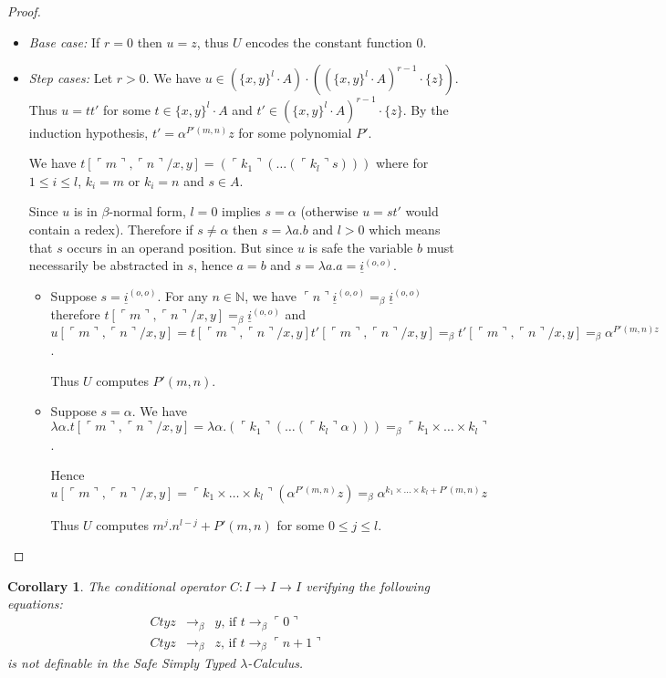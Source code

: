 \documentclass{article}
\newtheorem{corollary}[theorem]{Corollary}
\newcommand{\encode}[1]{\ulcorner #1 \urcorner}
\newcommand{\nat}{\mathbb{N}}
\begin{document}
\begin{proof}
\begin{itemize}

\item \emph{Base case:} If $r = 0$ then $u = z$, thus $U$ encodes the constant function $0$.

\item \emph{Step cases:} Let $r>0$. We have
 $u \in (\{ x, y\}^l \cdot A) \cdot \left( (\{ x, y\}^l \cdot A)^{r-1} \cdot \{ z \} \right)$. Thus $u = t t'$ for some $t \in \{ x, y\}^l \cdot A$ and $t' \in
(\{ x, y\}^l \cdot A)^{r-1} \cdot \{ z \}$. By the induction hypothesis, $t' = \alpha^{P'(m,n)} z$ for some polynomial $P'$.

We have $t[\encode{m}, \encode{n}/x,y] = (\encode{k_1} (\ldots (\encode{k_l} s)))$ where for $1 \leq i \leq l$, $k_i = m$ or $k_i = n$ and $s \in A$.

Since $u$ is in $\beta$-normal form, $l=0$ implies $s = \alpha$ 
(otherwise $u = s t'$ would contain a redex).
Therefore if $s \neq \alpha$ then $s=\lambda a . b$ and $l>0$ which means that $s$ occurs in an operand position. But since $u$ is safe the variable $b$ must necessarily be abstracted in $s$, hence $a=b$ and $s =  \lambda a . a = \underline{i}^{(o,o)}$.

\begin{itemize}
\item Suppose $s= \underline{i}^{(o,o)}$.
For any $n \in \nat$, we have $\encode{n} \underline{i}^{(o,o)} =_\beta \underline{i}^{(o,o)}$ therefore $t[\encode{m}, \encode{n}/x,y] =_\beta \underline{i}^{(o,o)}$ and $u[\encode{m}, \encode{n}/x,y] = t [\encode{m}, \encode{n}/x,y] t' [\encode{m}, \encode{n}/x,y] =_\beta t' [\encode{m}, \encode{n}/x,y] =_\beta \alpha^{P'(m,n) z}$.

Thus $U$ computes $P'(m,n)$.

\item Suppose $s=\alpha$. 
We have
$\lambda \alpha . t[\encode{m}, \encode{n}/x,y] = \lambda \alpha . (\encode{k_1} (\ldots (\encode{k_l} \alpha))) =_\beta \encode{k_1 \times \ldots \times k_l}$.

Hence  $u[\encode{m}, \encode{n}/x,y] = \encode{k_1 \times \ldots \times k_l} (\alpha^{P'(m,n)} z)=_\beta \alpha^{k_1 \times \ldots \times k_l + P'(m,n)} z$

Thus $U$ computes $m^j . n^{l-j} + P'(m,n)$ for some $0\leq j \leq l$.
\end{itemize}
\end{itemize}
\end{proof}

\begin{corollary}
The conditional operator $C:I\rightarrow I\rightarrow I$ verifying the following equations:
\begin{eqnarray*}
C t y z &\rightarrow_\beta& y \mbox{, if } t \rightarrow_\beta \encode{0} \\
C t y z &\rightarrow_\beta& z \mbox{, if } t \rightarrow_\beta \encode{n+1}
\end{eqnarray*}
is not definable in the Safe Simply Typed $\lambda$-Calculus.
\end{corollary}





\end{document}
